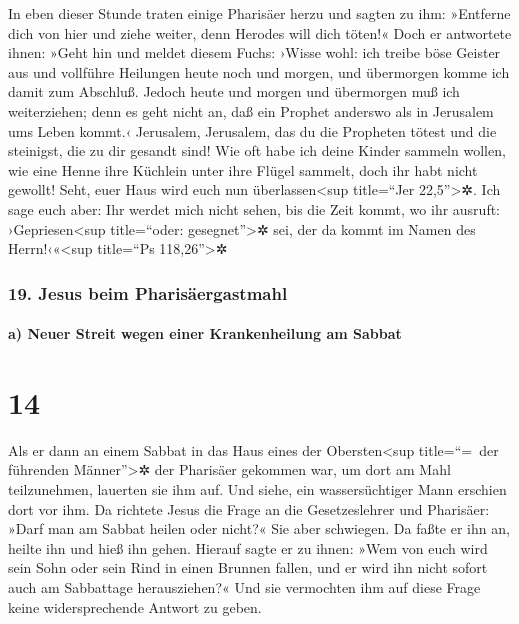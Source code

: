  In eben dieser Stunde traten einige Pharisäer herzu und
sagten zu ihm: »Entferne dich von hier und ziehe weiter, denn Herodes
will dich töten!«  Doch er antwortete ihnen: »Geht hin
und meldet diesem Fuchs: ›Wisse wohl: ich treibe böse Geister aus und
vollführe Heilungen heute noch und morgen, und übermorgen komme ich
damit zum Abschluß.  Jedoch heute und morgen und
übermorgen muß ich weiterziehen; denn es geht nicht an, daß ein Prophet
anderswo als in Jerusalem ums Leben kommt.‹  Jerusalem,
Jerusalem, das du die Propheten tötest und die steinigst, die zu dir
gesandt sind! Wie oft habe ich deine Kinder sammeln wollen, wie eine
Henne ihre Küchlein unter ihre Flügel sammelt, doch ihr habt nicht
gewollt!  Seht, euer Haus wird euch nun
überlassen\textless sup title=``Jer 22,5''\textgreater✲. Ich sage euch
aber: Ihr werdet mich nicht sehen, bis die Zeit kommt, wo ihr ausruft:
›Gepriesen\textless sup title=``oder: gesegnet''\textgreater✲ sei, der
da kommt im Namen des Herrn!‹«\textless sup title=``Ps
118,26''\textgreater✲

\hypertarget{jesus-beim-pharisuxe4ergastmahl}{%
\subsubsection{19. Jesus beim
Pharisäergastmahl}\label{jesus-beim-pharisuxe4ergastmahl}}

\hypertarget{a-neuer-streit-wegen-einer-krankenheilung-am-sabbat}{%
\paragraph{a) Neuer Streit wegen einer Krankenheilung am
Sabbat}\label{a-neuer-streit-wegen-einer-krankenheilung-am-sabbat}}

\hypertarget{section-13}{%
\section{14}\label{section-13}}

 Als er dann an einem Sabbat in das Haus eines der
Obersten\textless sup title=``=~der führenden Männer''\textgreater✲ der
Pharisäer gekommen war, um dort am Mahl teilzunehmen, lauerten sie ihm
auf.  Und siehe, ein wassersüchtiger Mann erschien dort
vor ihm.  Da richtete Jesus die Frage an die
Gesetzeslehrer und Pharisäer: »Darf man am Sabbat heilen oder nicht?«
 Sie aber schwiegen. Da faßte er ihn an, heilte ihn und
hieß ihn gehen.  Hierauf sagte er zu ihnen: »Wem von euch
wird sein Sohn oder sein Rind in einen Brunnen fallen, und er wird ihn
nicht sofort auch am Sabbattage herausziehen?«  Und sie
vermochten ihm auf diese Frage keine widersprechende Antwort zu geben.

